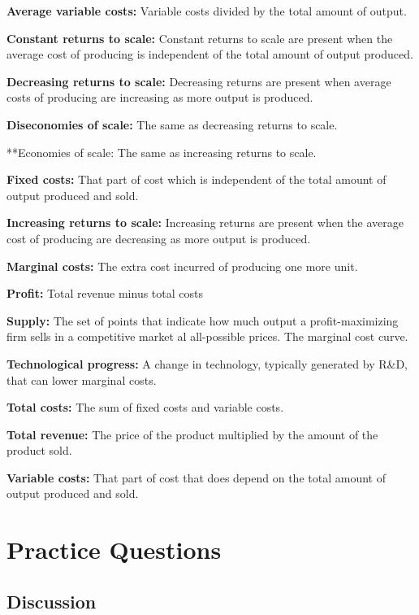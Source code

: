 \documentclass[
]{book}
\begin{document}
\textbf{Average variable costs:} Variable costs divided by the total amount of output.

\textbf{Constant returns to scale:} Constant returns to scale are present when the average cost of producing is independent of the total amount of output produced.

\textbf{Decreasing returns to scale:} Decreasing returns are present when average costs of producing are increasing as more output is produced.

\textbf{Diseconomies of scale:} The same as decreasing returns to scale.

**Economies of scale: The same as increasing returns to scale.

\textbf{Fixed costs:} That part of cost which is independent of the total amount of output produced and sold.

\textbf{Increasing returns to scale:} Increasing returns are present when the average cost of producing are decreasing as more output is produced.

\textbf{Marginal costs:} The extra cost incurred of producing one more unit.

\textbf{Profit:} Total revenue minus total costs

\textbf{Supply:} The set of points that indicate how much output a profit-maximizing firm sells in a competitive market al all-possible prices. The marginal cost curve.

\textbf{Technological progress:} A change in technology, typically generated by R\&D, that can lower marginal costs.

\textbf{Total costs:} The sum of fixed costs and variable costs.

\textbf{Total revenue:} The price of the product multiplied by the amount of the product sold.

\textbf{Variable costs:} That part of cost that does depend on the total amount of output produced and sold.

\hypertarget{practice-questions-4}{%
\section{Practice Questions}\label{practice-questions-4}}

\hypertarget{discussion-4}{%
\subsection{Discussion}\label{discussion-4}}
\end{document}
